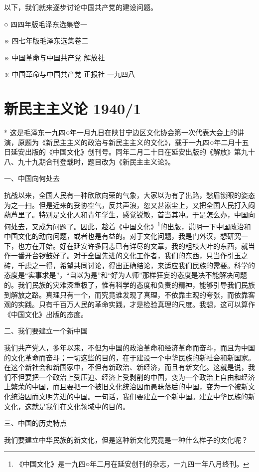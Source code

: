 \documentclass[UTF8, 12pt, a4paper]{ctexrep}
\begin{document}
以下，我们就来逐步讨论中国共产党的建设问题。

○ 四四年版毛泽东选集卷一

※ 四七年版毛泽东选集卷二

※ 中国革命与中国共产党 解放社

※ 中国革命与中国共产党 正报社 一九四八

\section{新民主主义论 1940/1}

* 这是毛泽东一九四○年一月九日在陕甘宁边区文化协会第一次代表大会上的讲演，原题为《新民主主义的政治与新民主主义的文化》，载于一九四○年二月十五日延安出版的《中国文化》创刊号。同年二月二十日在延安出版的《解放》第九十八、九十九期合刊登载时，题目改为《新民主主义论》。

一、中国向何处去

抗战以来，全国人民有一种欣欣向荣的气象，大家以为有了出路，愁眉锁眼的姿态为之一扫。但是近来的妥协空气，反共声浪，忽又甚嚣尘上，又把全国人民打入闷葫芦里了。特别是文化人和青年学生，感觉锐敏，首当其冲。于是怎么办，中国向何处去，又成为问题了。因此，趁着《中国文化》\footnote{《中国文化》是一九四○年二月在延安创刊的杂志，一九四一年八月终刊。}的出版，说明一下中国政治和中国文化的动向问题，或者也是有益的。对于文化问题，我是门外汉，想研究一下，也方在开始。好在延安许多同志已有详尽的文章，我的粗枝大叶的东西，就当作一番开台锣鼓好了。对于全国先进的文化工作者，我们的东西，只当作引玉之砖，千虑之一得，希望共同讨论，得出正确结论，来适应我们民族的需要。科学的态度是“实事求是”，“自以为是”和“好为人师”那样狂妄的态度是决不能解决问题的。我们民族的灾难深重极了，惟有科学的态度和负责的精神，能够引导我们民族到解放之路。真理只有一个，而究竟谁发现了真理，不依靠主观的夸张，而依靠客观的实践。只有千百万人民的革命实践，才是检验真理的尺度。我想，这可以算作《中国文化》出版的态度。

二、我们要建立一个新中国

我们共产党人，多年以来，不但为中国的政治革命和经济革命而奋斗，而且为中国的文化革命而奋斗；一切这些的目的，在于建设一个中华民族的新社会和新国家。在这个新社会和新国家中，不但有新政治、新经济，而且有新文化。这就是说，我们不但要把一个政治上受压迫、经济上受剥削的中国，变为一个政治上自由和经济上繁荣的中国，而且要把一个被旧文化统治因而愚昧落后的中国，变为一个被新文化统治因而文明先进的中国。一句话，我们要建立一个新中国。建立中华民族的新文化，这就是我们在文化领域中的目的。

三、中国的历史特点

我们要建立中华民族的新文化，但是这种新文化究竟是一种什么样子的文化呢？
\end{document}
